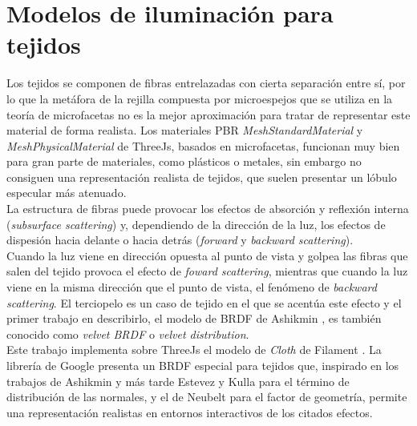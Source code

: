 \chapter{Modelos de iluminaci\'on para tejidos}
Los tejidos se componen de fibras entrelazadas con cierta separaci\'on entre s\'i, por lo que la met\'afora de la
rejilla compuesta por microespejos que se utiliza en la teor\'ia de microfacetas no es la mejor aproximaci\'on para tratar
de representar este material de forma realista. Los materiales PBR \textit{MeshStandardMaterial} y \textit{MeshPhysicalMaterial} de
ThreeJs, basados en microfacetas, funcionan muy bien para gran parte de materiales, como pl\'asticos o metales, sin embargo no consiguen
una representaci\'on realista de tejidos, que suelen presentar un l\'obulo especular m\'as atenuado.\\

La estructura de fibras puede provocar los efectos de absorci\'on y reflexi\'on interna (\textit{subsurface scattering}) y, dependiendo
de la direcci\'on de la luz, los efectos de dispesi\'on hacia delante o hacia detr\'as (\textit{forward} y \textit{backward scattering}).\\

Cuando la luz viene en direcci\'on opuesta al punto de vista y golpea las fibras que salen del tejido provoca el efecto de
\textit{foward scattering}, mientras que cuando la luz viene en la misma direcci\'on que el punto de vista, el fen\'omeno
de \textit{backward scattering}. El terciopelo es un caso de tejido en el que se acent\'ua este efecto y el primer trabajo en describirlo, el modelo de BRDF de Ashikmin
\autocite{ashikhmin}, es tambi\'en conocido como \textit{velvet BRDF} o \textit{velvet distribution}.\\

Este trabajo implementa sobre ThreeJs el modelo de \textit{Cloth} de Filament \autocite{filament}. La librer\'ia de Google
presenta un BRDF especial para tejidos que, inspirado en los trabajos de Ashikmin \autocite{ashikhmin} y m\'as
tarde Estevez y Kulla \autocite{sheenbrdf} para el t\'ermino de distribuci\'on de las normales, y el de Neubelt \autocite{theorder}
para el factor de geometr\'ia, permite una representaci\'on realistas en entornos interactivos de los citados efectos.


